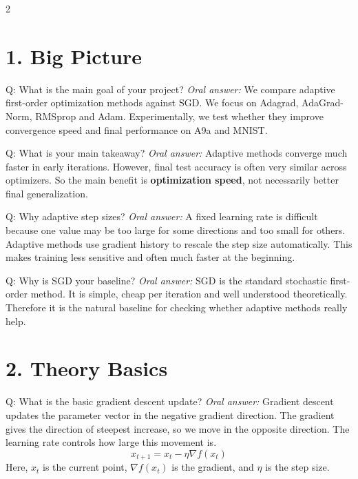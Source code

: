 \documentclass[a4paper,9pt]{article}
\newcommand{\oral}{\textit{\color{darkgray}Oral answer: }}
\begin{document}
\begin{multicols}{2}

\section{1. Big Picture}

\begin{qa}{Q: What is the main goal of your project?}
\oral We compare adaptive first-order optimization methods against SGD. 
We focus on Adagrad, AdaGrad-Norm, RMSprop and Adam. 
Experimentally, we test whether they improve convergence speed and final performance on A9a and MNIST.
\end{qa}

\begin{qa}{Q: What is your main takeaway?}
\oral Adaptive methods converge much faster in early iterations. 
However, final test accuracy is often very similar across optimizers. 
So the main benefit is \textbf{optimization speed}, not necessarily better final generalization.
\end{qa}

\begin{qa}{Q: Why adaptive step sizes?}
\oral A fixed learning rate is difficult because one value may be too large for some directions and too small for others. 
Adaptive methods use gradient history to rescale the step size automatically. 
This makes training less sensitive and often much faster at the beginning.
\end{qa}

\begin{qa}{Q: Why is SGD your baseline?}
\oral SGD is the standard stochastic first-order method. 
It is simple, cheap per iteration and well understood theoretically. 
Therefore it is the natural baseline for checking whether adaptive methods really help.
\end{qa}

\section{2. Theory Basics}

\begin{qa}{Q: What is the basic gradient descent update?}
\oral Gradient descent updates the parameter vector in the negative gradient direction. 
The gradient gives the direction of steepest increase, so we move in the opposite direction. 
The learning rate controls how large this movement is.
\[
x_{t+1}=x_t-\eta\nabla f(x_t)
\]
Here, \(x_t\) is the current point, \(\nabla f(x_t)\) is the gradient, and \(\eta\) is the step size.
\end{qa}


\end{multicols}
\end{document}
